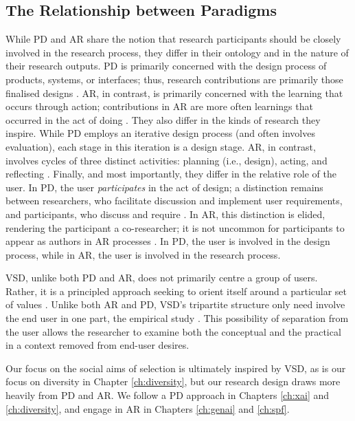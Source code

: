 \subsection{The Relationship between Paradigms}
While PD and AR share the notion that research participants should be closely involved in the research process, they differ in their ontology and in the nature of their research outputs. PD is primarily concerned with the design process of products, systems, or interfaces; thus, research contributions are primarily those finalised designs \cite{zimmerman_research_2014}. AR, in contrast, is primarily concerned with the learning that occurs through action; contributions in AR are more often learnings that occurred in the act of doing \cite{Hult1980TOWARDSAD}. They also differ in the kinds of research they inspire. While PD employs an iterative design process (and often involves evaluation), each stage in this iteration is a design stage. AR, in contrast, involves cycles of three distinct activities: planning (i.e., design), acting, and reflecting \cite{Hult1980TOWARDSAD}. Finally, and most importantly, they differ in the relative role of the user. In PD, the user \emph{participates} in the act of design; a distinction remains between researchers, who facilitate discussion and implement user requirements, and participants, who discuss and require \cite{Hussain2014OverviewOV}. In AR, this distinction is elided, rendering the participant a co-researcher; it is not uncommon for participants to appear as authors in AR processes \cite{Hayes_2011}. In PD, the user is involved in the design process, while in AR, the user is involved in the research process.

VSD, unlike both PD and AR, does not primarily centre a group of users. Rather, it is a principled approach seeking to orient itself around a particular set of values \cite{10.1145/242485.242493}. Unlike both AR and PD, VSD's tripartite structure only need involve the end user in one part, the empirical study \cite{10.1145/242485.242493}. This possibility of separation from the user allows the researcher to examine both the conceptual and the practical in a context removed from end-user desires. 

Our focus on the social aims of selection is ultimately inspired by VSD, as is our focus on diversity in Chapter \ref{ch:diversity}, but our research design draws more heavily from PD and AR. We follow a PD approach in Chapters \ref{ch:xai} and \ref{ch:diversity}, and engage in AR in Chapters \ref{ch:genai} and \ref{ch:spf}.

